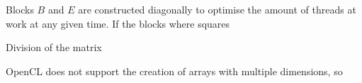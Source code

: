 Blocks $B$ and $E$ are constructed diagonally to optimise the amount of threads at work at any given time.
If the blocks where squares 


\begin{table}[h]
    \centering
    
    \caption{Division of the matrix} \label{division}
\end{table}


\begin{comment}
\begin{algorithm}
\caption{Parallel Levenshtein Algorithm} \label{pseudo}
\begin{algorithmic}[1]
\Procedure{Levenshtein}{$col, row, id, n, a, b, d1, d2, out$}\Comment{The Levenshtein distance between sequences $a$ and $b$}
    \Require $n is even$
    \Require $out is int[n]$
    \State $col\gets col + id$
    \State $row\gets row - id$
    \For{$row \dots row + n$}
        \If{$a[col] \not= b[row]$}
            \State $cost\gets 1$
        \Else
            \State $cost\gets 0$
        \EndIf
        
        
    \EndFor
\EndProcedure
\end{algorithmic}
\end{algorithm}
\end{comment}

OpenCL does not support the creation of arrays with multiple dimensions, so 



